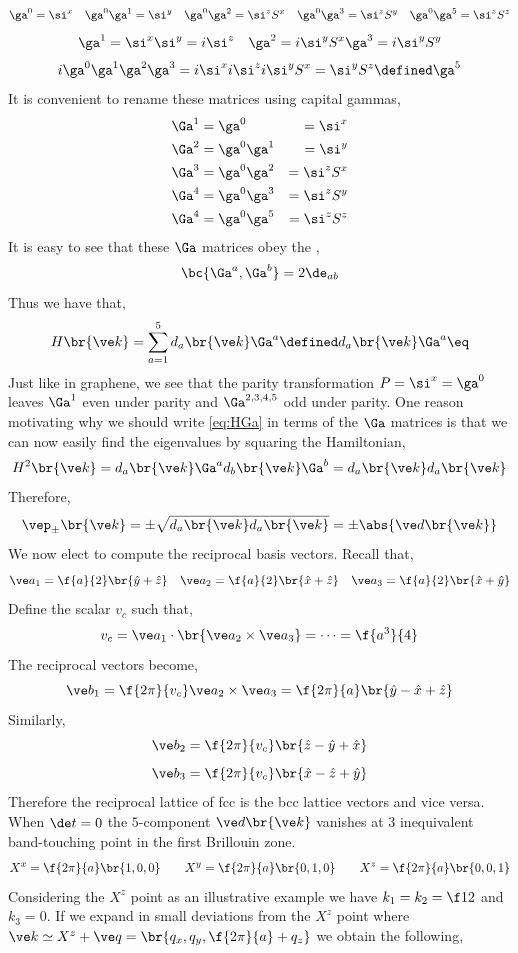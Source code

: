 \documentclass{article}
\begin{document}
\[ \ga^{0} = \si^{x} \quad \ga^{0}\ga^{1} = \si^{y} \quad \ga^{0}\ga^{2} = \si^{z}S^{x} \quad \ga^{0}\ga^{3} = \si^{z}S^y \quad \ga^{0}\ga^{5} = \si^{z} S^{z}\]
\[ \ga^{1} = \si^{x} \si^{y} = i \si^z \quad \ga^{2} = i \si^{y}S^{x} \ga^{3} = i \si^{y}S^{y} \]
\[ i \ga^{0}\ga^{1}\ga^{2}\ga^{3} = i \si^{x} i \si^{z} i \si^{y}S^{x} = \si^{y}S^{z} \defined \ga^{5} \]
It is convenient to rename these matrices using capital gammas,
\begin{alignat*}{2}
\Ga^{1} &= \ga^{0} &= \si^{x} \\
\Ga^{2} &= \ga^{0}\ga^{1} &= \si^{y} \\
\Ga^{3} &= \ga^{0}\ga^{2} &= \si^{z}S^{x} \\
\Ga^{4} &= \ga^{0}\ga^{3} &= \si^{z}S^y \\
\Ga^{4} &= \ga^{0}\ga^{5} &= \si^{z} S^{z}
\end{alignat*}
It is easy to see that these $\Ga$ matrices obey the ,
\[ \bc{\Ga^{a}, \Ga^{b}} = 2 \de_{ab} \]
Thus we have that,
\[ H\br{\ve k} = \sum_{a = 1}^{5} d_a\br{\ve k}\Ga^{a} \defined d_a\br{\ve k}\Ga^{a} \eq \label{eq:HGa}\]
Just like in graphene, we see that the parity transformation $P = \si^{x} = \ga^{0}$ leaves $\Ga^{1}$ even under parity and $\Ga^{2,3,4,5}$ odd under parity. One reason motivating why we should write \cref{eq:HGa} in terms of the $\Ga$ matrices is that we can now easily find the eigenvalues by squaring the Hamiltonian,
\[ H^2\br{\ve k} = d_a\br{\ve k}\Ga^{a} d_b\br{\ve k}\Ga^{b} = d_a \br{\ve k} d_a\br{\ve k} \]
Therefore,
\[ \vep_{\pm}\br{\ve k} = \pm \sqrt{d_a \br{\ve k} d_a\br{\ve k}} = \pm \abs{\ve d\br{\ve k}} \]
We now elect to compute the reciprocal basis vectors. Recall that,
\[ \ve a_1 = \f{a}{2} \br{\hat y + \hat z} \quad \ve a_2 = \f{a}{2} \br{\hat x + \hat z} \quad \ve a_3 = \f{a}{2} \br{\hat x + \hat y} \]
Define the scalar $v_c$ such that,
\[ v_c = \ve a_1 \cdot \br{\ve a_2 \times \ve a_3} = \cdots = \f{a^3}{4} \]
The reciprocal vectors become,
\[ \ve b_1 = \f{2\pi}{v_c} \ve a_2 \times \ve a_3 = \f{2 \pi}{a} \br{\hat y - \hat x + \hat z} \]
Similarly,
\[ \ve b_2 = \f{2\pi}{v_c} \br{\hat z - \hat y + \hat x} \]
\[ \ve b_3 = \f{2\pi}{v_c} \br{\hat x - \hat z + \hat y} \]
Therefore the reciprocal lattice of fcc is the bcc lattice vectors and vice versa.
When $\de t = 0$ the $5$-component $\ve d\br{\ve k}$ vanishes at $3$ inequivalent band-touching point in the first Brillouin zone.
\[ X^{x} = \f{2\pi}{a}\br{1,0,0} \qquad X^{y} = \f{2\pi}{a}\br{0,1,0} \qquad X^{z} = \f{2\pi}{a}\br{0,0,1} \]
Considering the $X^{z}$ point as an illustrative example we have $k_1 = k_2 = \f12$ and $k_3 = 0$. If we expand in small deviations from the $X^z$ point where $\ve k \simeq X^{z} + \ve q = \br{q_x, q_y, \f{2\pi}{a} + q_z}$ we obtain the following,
\end{document}
